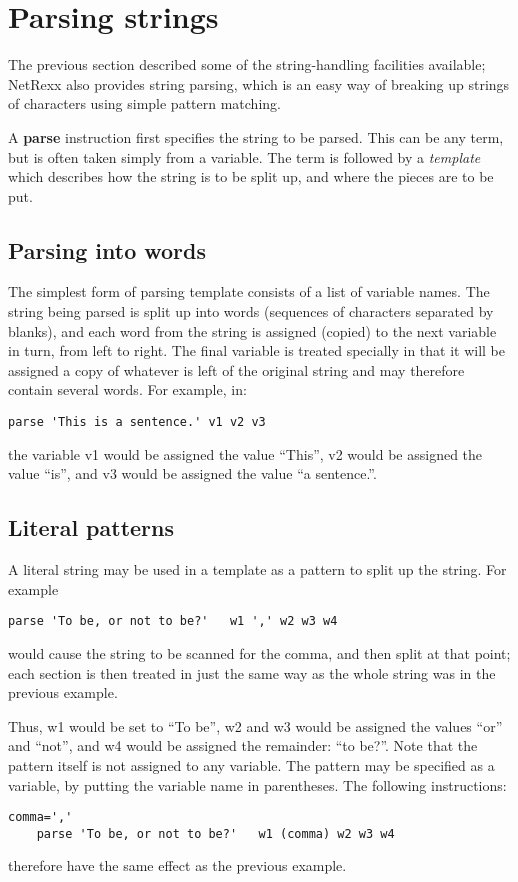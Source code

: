\section{Parsing strings}
The previous section described some of the string-handling facilities
available; NetRexx also provides string parsing, which is an easy way
of breaking up strings of characters using simple pattern matching.

A \textbf{parse} instruction first specifies the string to be parsed. This can be any term, but is often taken simply from a variable. The term is followed by a \emph{template} which describes how the string is to be split up, and where the pieces are to be put.
\subsection{Parsing into words}
The simplest form of parsing template consists of a list of variable
names. The string being parsed is split up into words (sequences of
characters separated by blanks), and each word from the string is
assigned (copied) to the next variable in turn, from left to
right. The final variable is treated specially in that it will be
assigned a copy of whatever is left of the original string and may
therefore contain several words. For example, in:
\begin{lstlisting}[label=parsingstrings,caption=Parsing Strings]
parse 'This is a sentence.' v1 v2 v3
\end{lstlisting}
the variable v1 would be assigned the value “This”, v2 would be assigned the value
“is”, and v3 would be assigned the value “a sentence.”.
\subsection{Literal patterns}
A literal string may be used in a template as a pattern to split up
the string. For example
\begin{lstlisting}[label=parse,caption=Parse]
    parse 'To be, or not to be?'   w1 ',' w2 w3 w4
\end{lstlisting}
would cause the string to be scanned for the comma, and then split at that point; each section is then treated in just the same way as the whole string was in the previous example.

Thus, w1 would be set to “To be”, w2 and w3 would be assigned the values “or” and “not”, and w4 would be assigned the remainder: “to be?”. Note that the pattern itself is not assigned to any variable.
The pattern may be specified as a variable, by putting the variable
name in parentheses. The following instructions:
\begin{lstlisting}[label=comma,caption=Parse with comma]
    comma=','
    parse 'To be, or not to be?'   w1 (comma) w2 w3 w4
\end{lstlisting}
therefore have the same effect as the previous example.
